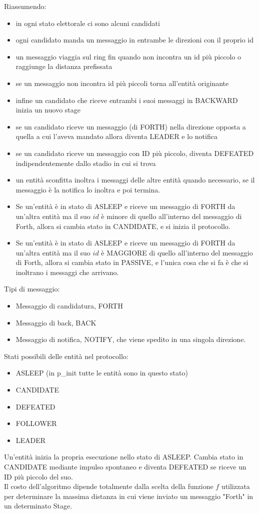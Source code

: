 Riassumendo:
\begin{itemize}
\item in ogni stato elettorale ci sono alcuni candidati
\item ogni candidato manda un messaggio in entrambe le direzioni con il proprio id
\item un messaggio viaggia sul ring fin quando non incontra un id più piccolo o raggiunge la distanza prefissata
\item se un messaggio non incontra id più piccoli torna all'entità originante
\item infine un candidato che riceve entrambi i suoi messaggi in BACKWARD inizia un nuovo stage
\item se un candidato riceve un messaggio (di FORTH) nella direzione opposta a quella a cui l'aveva mandato allora diventa LEADER e lo notifica
\item se un candidato riceve un messaggio con ID più piccolo, diventa DEFEATED indipendentemente dallo stadio in cui si trova
\item un entità sconfitta inoltra i messaggi delle altre entità quando necessario, se il messaggio è la notifica lo inoltra e poi termina.
\item Se un'entità è in stato di ASLEEP e riceve un messaggio di FORTH da un'altra entità ma il suo $id$ è minore di quello all'interno del messaggio di Forth, allora si cambia stato in CANDIDATE, e si inizia il protocollo.
\item Se un'entità è in stato di ASLEEP e riceve un messaggio di FORTH da un'altra entità ma il suo $id$ è MAGGIORE di quello all'interno del messaggio di Forth, allora si cambia stato in PASSIVE, e l'unica cosa che si fa è che si inoltrano i messaggi che arrivano.

\end{itemize}
Tipi di messaggio:\\
\vspace{-10mm}
\begin{itemize}
\item Messaggio di candidatura, FORTH
\item Messaggio di back, BACK
\item Messaggio di notifica, NOTIFY, che viene spedito in una singola direzione.
\end{itemize}
Stati possibili delle entità nel protocollo:
\begin{itemize}
    \item ASLEEP (in p\_{init} tutte le entità sono in questo stato)
    \item CANDIDATE
    \item DEFEATED
    \item FOLLOWER
    \item LEADER
\end{itemize}
Un'entità inizia la propria esecuzione nello stato di ASLEEP. Cambia stato in CANDIDATE mediante impulso spontaneo e diventa DEFEATED se riceve un ID più piccolo del suo.\\
Il costo dell'algoritmo dipende totalmente dalla scelta della funzione $f$ utilizzata per determinare la massima distanza in cui viene inviato un messaggio "Forth" in un determinato Stage.
